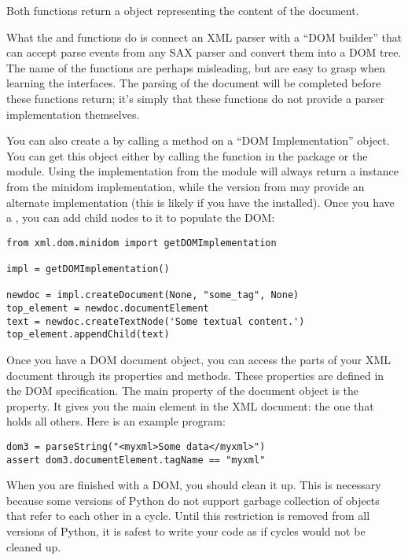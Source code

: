 Both functions return a  object representing the
content of the document.

What the  and  functions do
is connect an XML parser with a ``DOM builder'' that can accept parse
events from any SAX parser and convert them into a DOM tree.  The name
of the functions are perhaps misleading, but are easy to grasp when
learning the interfaces.  The parsing of the document will be
completed before these functions return; it's simply that these
functions do not provide a parser implementation themselves.

You can also create a  by calling a method on a ``DOM
Implementation'' object.  You can get this object either by calling
the  function in the
 package or the  module.
Using the implementation from the  module will
always return a  instance from the minidom
implementation, while the version from  may provide
an alternate implementation (this is likely if you have the
 installed).  Once
you have a , you can add child nodes to it to populate
the DOM:

\begin{verbatim}
from xml.dom.minidom import getDOMImplementation

impl = getDOMImplementation()

newdoc = impl.createDocument(None, "some_tag", None)
top_element = newdoc.documentElement
text = newdoc.createTextNode('Some textual content.')
top_element.appendChild(text)
\end{verbatim}

Once you have a DOM document object, you can access the parts of your
XML document through its properties and methods.  These properties are
defined in the DOM specification.  The main property of the document
object is the  property.  It gives you the
main element in the XML document: the one that holds all others.  Here
is an example program:

\begin{verbatim}
dom3 = parseString("<myxml>Some data</myxml>")
assert dom3.documentElement.tagName == "myxml"
\end{verbatim}

When you are finished with a DOM, you should clean it up.  This is
necessary because some versions of Python do not support garbage
collection of objects that refer to each other in a cycle.  Until this
restriction is removed from all versions of Python, it is safest to
write your code as if cycles would not be cleaned up.

